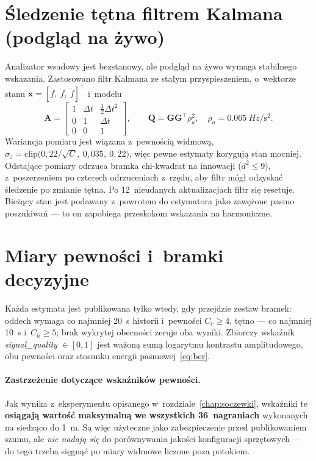 \documentclass[12pt,a4paper,oneside]{report}
\begin{document}
\section{Śledzenie tętna filtrem Kalmana (podgląd na żywo)}
Analizator wsadowy jest bezstanowy, ale podgląd na żywo wymaga stabilnego
wskazania. Zastosowano filtr Kalmana ze stałym przyspieszeniem, o~wektorze
stanu $\mathbf{x} = [f,\ \dot f,\ \ddot f]^{\top}$ i~modelu
\begin{equation}
  \mathbf{A} =
  \begin{bmatrix}
    1 & \Delta t & \tfrac{1}{2}\Delta t^2\\
    0 & 1 & \Delta t\\
    0 & 0 & 1
  \end{bmatrix},
  \qquad
  \mathbf{Q} = \mathbf{G}\mathbf{G}^{\!\top}\rho_a^2,
  \quad \rho_a = \SI{0.065}{Hz\per\second\squared}.
  \label{eq:kalman}
\end{equation}
Wariancja pomiaru jest wiązana z~pewnością widmową,
$\sigma_z = \mathrm{clip}\big(0{,}22/\sqrt{C},\ 0{,}035,\ 0{,}22\big)$, więc
pewne estymaty korygują stan mocniej. Odstające pomiary odrzuca bramka
chi-kwadrat na innowacji ($d^2 \leq 9$), z~poszerzeniem po czterech
odrzuceniach z~rzędu, aby filtr mógł odzyskać śledzenie po zmianie tętna.
Po 12~nieudanych aktualizacjach filtr się resetuje. Bieżący stan jest
podawany z~powrotem do estymatora jako zawężone pasmo poszukiwań --- to on
zapobiega przeskokom wskazania na harmoniczne.

\section{Miary pewności i~bramki decyzyjne}
Każda estymata jest publikowana tylko wtedy, gdy przejdzie zestaw bramek:
oddech wymaga co najmniej \SI{20}{s} historii i~pewności $C_r \geq 4$, tętno ---
co najmniej \SI{10}{s} i~$C_h \geq 5$; brak wykrytej obecności zeruje oba
wyniki. Zbiorczy wskaźnik \emph{signal\_quality} $\in [0,1]$ jest ważoną sumą
logarytmu kontrastu amplitudowego, obu pewności oraz stosunku energii
pasmowej~\eqref{eq:ber}.

\paragraph{Zastrzeżenie dotyczące wskaźników pewności.} Jak wynika z~eksperymentu opisanego
w~rozdziale~\ref{chap:soczewki}, wskaźniki te \textbf{osiągają wartość
maksymalną we wszystkich 36~nagraniach} wykonanych na siedząco do \SI{1}{m}.
Są więc użyteczne jako zabezpieczenie przed publikowaniem szumu, ale
\emph{nie nadają się} do porównywania jakości konfiguracji sprzętowych ---
do tego trzeba sięgnąć po miary widmowe liczone poza potokiem.
\end{document}
